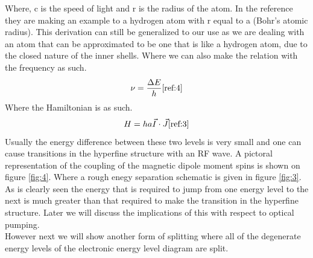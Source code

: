 \documentclass[twocolumn]{article}
\begin{document}
Where, c is the speed of light and r is the radius of the atom. In the 
reference they are making an example to a hydrogen atom with r equal to a 
(Bohr's atomic radius). This derivation can still be generalized to our use as 
we are dealing with an atom that can be approximated to be one that is like a 
hydrogen atom, due to the closed nature of the inner shells. 
Where we can also make the relation with the frequency as such.
\begin{equation}
\nu = \frac{\Delta E}{h}
\label{eqn:4}
\cite{ref:4}
\end{equation}
Where the Hamiltonian is as such.
\begin{equation}
H=ha\vec{I}\cdot\vec{J}
\label{eqn:5}
\cite{ref:3}
\end{equation}
Usually the energy difference between these two levels is very small and one 
can cause transitions in the hyperfine structure with an RF wave. A pictoral 
representation of the coupling of the magnetic dipole moment spins is shown on 
figure \ref{fig:4}. Where a rough enegy separation schematic is given in figure 
\ref{fig:3}. As is clearly seen the energy that is required to jump from one 
energy level to the next is much greater than that required to make the 
transition in the hyperfine structure. Later we will discuss the implications 
of this with respect to optical pumping.
\\
However next we will show another form of splitting where all of the degenerate 
energy levels of the electronic energy level diagram are split.
\end{document}
